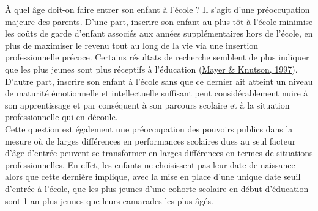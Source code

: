 \documentclass[
]{book}
\begin{document}
À quel âge doit-on faire entrer son enfant à l'école ? Il s'agit d'une préoccupation majeure des parents. D'une part, inscrire son enfant au plus tôt à l'école minimise les coûts de garde d'enfant associés aux années supplémentaires hors de l'école, en plus de maximiser le revenu tout au long de la vie via une insertion professionnelle précoce. Certains résultats de recherche semblent de plus indiquer que les plus jeunes sont plus réceptifs à l'éducation (\protect\hyperlink{ref-MAY:KNU:97}{Mayer \& Knutson, 1997}). D'autre part, inscrire son enfant à l'école sans que ce dernier ait atteint un niveau de maturité émotionnelle et intellectuelle suffisant peut considérablement nuire à son apprentissage et par conséquent à son parcours scolaire et à la situation professionnelle qui en découle.\\
Cette question est également une préoccupation des pouvoirs publics dans la mesure où de larges différences en performances scolaires dues au seul facteur d'âge d'entrée peuvent se transformer en larges différences en termes de situations professionnelles. En effet, les enfants ne choisissent pas leur date de naissance alors que cette dernière implique, avec la mise en place d'une unique date seuil d'entrée à l'école, que les plus jeunes d'une cohorte scolaire en début d'éducation sont 1 an plus jeunes que leurs camarades les plus âgés.
\end{document}
